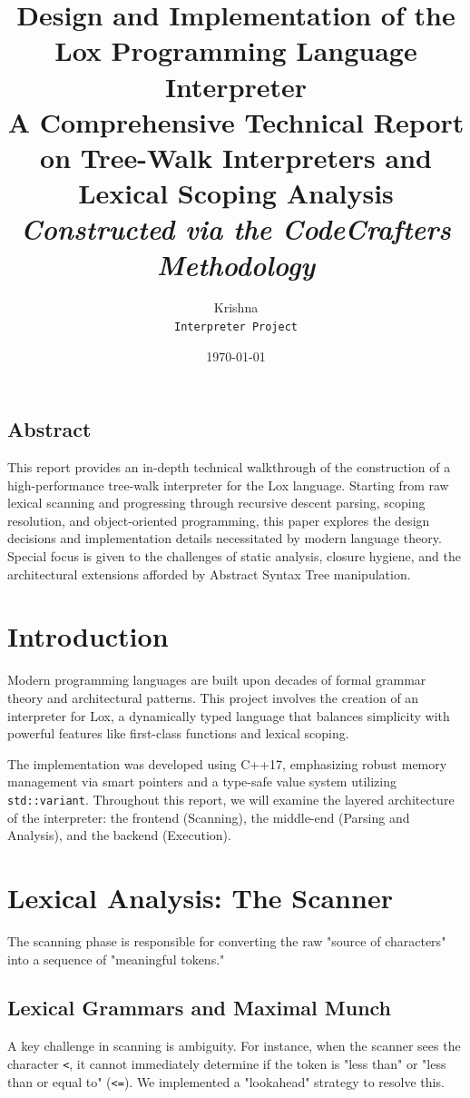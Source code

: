 \documentclass[12pt,a4paper,oneside]{report}
\title{
    \Huge \textbf{Design and Implementation of the Lox Programming Language Interpreter} \\
    \vspace{2cm}
    \large A Comprehensive Technical Report on Tree-Walk Interpreters and Lexical Scoping Analysis \\
    \vspace{1cm}
    \textit{Constructed via the CodeCrafters Methodology}
}
\author{Krishna \\ \small \texttt{Interpreter Project}}
\date{\today}
\begin{document}
\maketitle

\section*{Abstract}
This report provides an in-depth technical walkthrough of the construction of a high-performance tree-walk interpreter for the Lox language. Starting from raw lexical scanning and progressing through recursive descent parsing, scoping resolution, and object-oriented programming, this paper explores the design decisions and implementation details necessitated by modern language theory. Special focus is given to the challenges of static analysis, closure hygiene, and the architectural extensions afforded by Abstract Syntax Tree manipulation.

\tableofcontents

\chapter{Introduction}
Modern programming languages are built upon decades of formal grammar theory and architectural patterns. This project involves the creation of an interpreter for Lox, a dynamically typed language that balances simplicity with powerful features like first-class functions and lexical scoping.

The implementation was developed using C++17, emphasizing robust memory management via smart pointers and a type-safe value system utilizing \texttt{std::variant}. Throughout this report, we will examine the layered architecture of the interpreter: the frontend (Scanning), the middle-end (Parsing and Analysis), and the backend (Execution).

\chapter{Lexical Analysis: The Scanner}
The scanning phase is responsible for converting the raw "source of characters" into a sequence of "meaningful tokens."

\section{Lexical Grammars and Maximal Munch}
A key challenge in scanning is ambiguity. For instance, when the scanner sees the character \texttt{<}, it cannot immediately determine if the token is "less than" or "less than or equal to" (\texttt{<=}). We implemented a "lookahead" strategy to resolve this.
\end{document}
